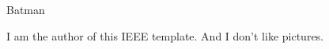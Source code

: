 \begin{IEEEbiographynophoto}
	{Batman}

	I am the author of this IEEE template. And I don't like pictures.
	
\end{IEEEbiographynophoto}